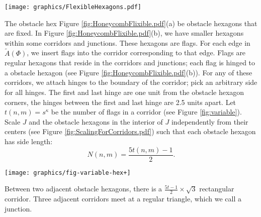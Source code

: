 \documentclass[10pt]{CSUNthesis}
\theoremstyle{plain}%
\theoremstyle{definition}
\theoremstyle{remark}
\begin{document}
\begin{minipage}{\linewidth}
\begin{center}
\texttt{[image: graphics/FlexibleHexagons.pdf]}
\label{fig:HoneycombFlixible.pdf}
\end{center}
\end{minipage}



The obstacle hex Figure \ref{fig:HoneycombFlixible.pdf}(a) be obstacle hexagons that are fixed.
In Figure \ref{fig:HoneycombFlixible.pdf}(b), we have smaller hexagons within some corridors and junctions.
These hexagons are flags.
For each edge in $\tilde{A}(\Phi)$, we insert flags into the corridor corresponding to that edge.
Flags are regular hexagons that reside in the corridors and junctions; each flag is hinged to a obstacle hexagon (see Figure \ref{fig:HoneycombFlixible.pdf}(b)).  
For any of these corridors, we attach hinges to the boundary of the corridor; pick an arbitrary side for all hinges.  
The first and last hinge are one unit from the obstacle hexagon corners, the hinges between the first and last hinge are 2.5 units apart.  
Let $t(n,m)=s^\kappa$ be the number of flags in a corridor (see Figure \ref{fig:variable}). 
Scale $J$ and the obstacle hexagons in the interior of $J$ independently from their centers (see Figure \ref{fig:ScalingForCorridors.pdf}) such that each obstacle hexagon has side length: $$N(n,m)=\frac{5t(n,m)-1}{2}.$$ 

\begin{minipage}{\linewidth}
\begin{center}
\texttt{[image: graphics/fig-variable-hex+]}
\label{fig:variable}
\end{center}
\end{minipage}

Between two adjacent obstacle hexagons, there is a $\frac{5t-1}{2}\times \sqrt{3}$ rectangular corridor.  %
Three adjacent corridors meet at a regular triangle, which we call a junction. 
\end{document}

